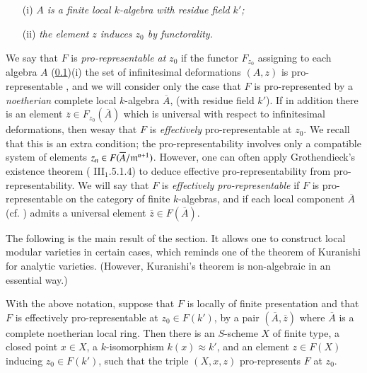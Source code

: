 \subsection{}\label{art02-sec5.1}
\begin{itemize}
\item[(i)] {\em $A$ is a finite local $k$-algebra with residue field $k'$;}

\item[(ii)] {\em the element $z$ induces $z_{0}$ by functorality.}
\end{itemize}
We say that $F$ is {\em pro-representable at} $z_{0}$ if the functor $F_{z_{0}}$ assigning to each algebra $A$ (\ref{art02-sec5.1})(i) the set of infinitesimal deformations $(A,z)$ is pro-representable \cite{art02-key11}, and we will consider only the case that $F$ is pro-represented by a {\em noetherian} complete local $k$-algebra $\overline{A}$, (with residue field $k'$). If in addition there is an element $\overline{z}\in F_{z_{0}}(\overline{A})$ which is universal with respect to infinitesimal deformations, then we\pageoriginale say that $F$ is {\em effectively} pro-representable at $z_{0}$. We recall that this is an extra condition; the pro-representability involves only a compatible system of elements $z_{n}\in F(\overline{A}/\mathfrak{m}^{n+1})$. However, one can often apply Grothendieck's existence theorem (\cite{art02-key8} III$_{1}$.5.1.4) to deduce effective pro-representability from pro-representability. We will say that $F$ is {\em effectively pro-represen\-table} if $F$ is pro-representable on the category of finite $k$-algebras, and if each local component $\overline{A}$ (cf. \cite{art02-key11}) admits a universal element $\overline{z}\in F(\overline{A})$.

The following is the main result of the section. It allows one to construct local modular varieties in certain cases, which reminds one of the theorem of Kuranishi \cite{art02-key20} for analytic varieties. (However, Kuranishi's theorem is non-algebraic in an essential way.)

\setcounter{theorem}{1}
\begin{theorem}\label{art02-thm5.2}
With the above notation, suppose that $F$ is locally of finite presentation and that $F$ is effectively pro-representable at $z_{0}\in F(k')$, by a pair $(\overline{A},\overline{z})$ where $\overline{A}$ is a complete noetherian local ring. Then there is an $S$-scheme $X$ of finite type, a closed point $x\in X$, a $k$-isomorphism $k(x)\approx k'$, and an element $z\in F(X)$ inducing $z_{0}\in F(k')$, such that the triple $(X,x,z)$ pro-represents $F$ at $z_{0}$.
\end{theorem}

